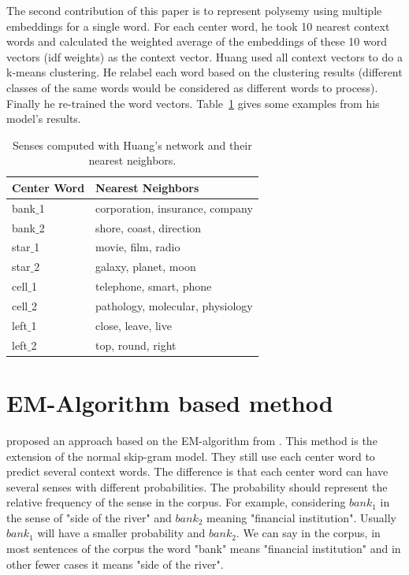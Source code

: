 The second contribution of this paper is to represent polysemy using multiple embeddings for a single word. For each center word, he took 10 nearest context words and calculated the weighted average of the embeddings of these 10 word vectors (idf weights) as the context vector. Huang used all context vectors to do a k-means clustering. He relabel  each word  based on the clustering results (different classes of the same words would be considered as different words to process). Finally he re-trained the word vectors. Table~\ref{tab:huang} gives some examples from his model's results.\\

\begin{table}[tb]
\begin{center}
\caption{Senses computed with Huang's network and their nearest neighbors.} 
\label{tab:huang}
\vspace{2mm}
 \begin{tabular}{|l|l|}
  \hline
  Center Word &Nearest Neighbors \\
  \hline  
  bank$\_$1 & corporation, insurance, company\\
  \hline
  bank$\_$2 & shore, coast, direction\\
  \hline
  star$\_$1 & movie, film, radio\\
  \hline
  star$\_$2 & galaxy, planet, moon\\
  \hline
  cell$\_$1 & telephone, smart, phone\\
  \hline
  cell$\_$2 & pathology, molecular, physiology\\
  \hline
  left$\_$1 & close, leave, live\\
  \hline
  left$\_$2 & top, round, right\\
  \hline
 \end{tabular}
\end{center}
\end{table}

\section{EM-Algorithm based method}


\cite{TianDaiEtAl2014} proposed an approach based on the EM-algorithm from . This method is the extension of the normal skip-gram model. They still use each center word to predict several context words. The difference is that each center word can have several senses with different probabilities. The probability should represent the relative frequency of the sense in the corpus. For example, considering $bank_1$ in the sense of "side of the river" and $bank_2$ meaning "financial institution". Usually $bank_1$ will have a smaller probability and $bank_2$. We can say in the corpus, in most sentences of the corpus the word "bank" means "financial institution" and in other fewer cases it means "side of the river". 

